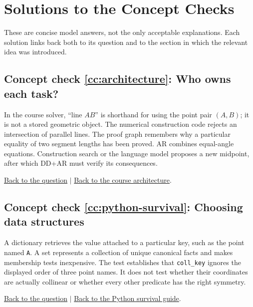 \documentclass[reqno]{amsart}
\DeclareMathOperator{\1}{\textbf{1}}
\begin{document}
\appendix
\section{Solutions to the Concept Checks}\label{sec: Concept Check Solutions}

These are concise model answers, not the only acceptable explanations. Each
solution links back both to its question and to the section in which the
relevant idea was introduced.

\begingroup
\renewcommand{\addcontentsline}[3]{}

\hypertarget{cca:architecture}{}
\subsection*{Concept check \ref{cc:architecture}: Who owns each task?}

In the course solver, ``line $AB$'' is shorthand for using the point pair
$(A,B)$; it is not a stored geometric object. The numerical construction code
rejects an intersection of parallel lines. The proof graph remembers why a
particular equality of two segment lengths has been proved. AR combines
equal-angle equations. Construction search or the language model proposes a
new midpoint, after which DD+AR must verify its consequences.

\noindent\hyperlink{ccq:architecture}{Back to the question}
$\mid$
\hyperref[sec: Architecture Course Solver]{Back to the course architecture}.

\hypertarget{cca:python-survival}{}
\subsection*{Concept check \ref{cc:python-survival}: Choosing data structures}

A dictionary retrieves the value attached to a particular key, such as the
point named \verb|A|. A set represents a collection of unique canonical facts
and makes membership tests inexpensive. The test establishes that
\verb|coll_key| ignores the displayed order of three point names. It does not
test whether their coordinates are actually collinear or whether every other
predicate has the right symmetry.

\noindent\hyperlink{ccq:python-survival}{Back to the question}
$\mid$
\hyperref[sec: Python Survival Guide]{Back to the Python survival guide}.
\end{document}

